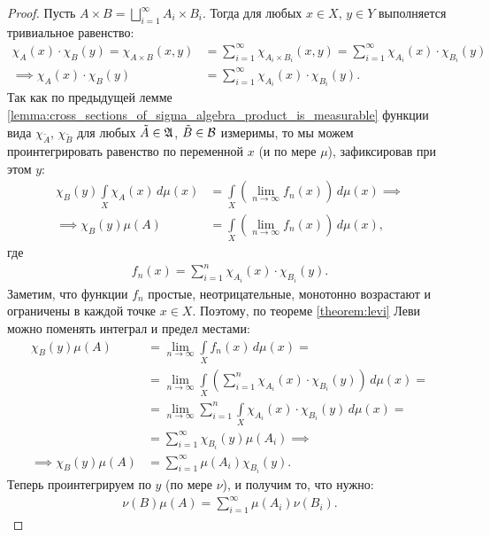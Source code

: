 \begin{proof}
 Пусть $A \times B = \bigsqcup_{i=1}^{\infty} A_i \times B_i$. Тогда для любых $x \in X$, $y \in Y$ выполняется тривиальное равенство: \begin{align*}
  \chi_A(x) \cdot \chi_B(y) = \chi_{A \times B}(x, y) &= \sum_{i=1}^{\infty} \chi_{A_i \times B_i}(x, y)  = \sum_{i=1}^{\infty} \chi_{A_i}(x) \cdot \chi_{B_i}(y) \\
  \implies \chi_A(x) \cdot \chi_B(y) &= \sum_{i=1}^{\infty} \chi_{A_i}(x) \cdot \chi_{B_i}(y)
  .\end{align*} Так как по предыдущей лемме \ref{lemma:cross_sections_of_sigma_algebra_product_is_measurable} функции вида $\chi_{\tilde A}$, $\chi_{\tilde B}$ для любых $\tilde A \in \mathfrak{A}$, $\tilde B \in \mathcal{B}$ измеримы, то мы можем проинтегрировать равенство по переменной $x$ (и по мере $\mu$), зафиксировав при этом $y$:  \begin{align*}
  \chi_B(y) \int\limits_{X} \chi_A(x) \, d\mu(x)   &= \int\limits_{X} \left( \lim_{n \to \infty} f_n(x)  \right) \, d\mu(x) \implies \\
 \implies \chi_B(y) \mu(A) &= \int\limits_{X} \left( \lim_{n \to \infty} f_n(x)  \right) \, d\mu(x)
,\end{align*} где \begin{align*}
f_n(x) = \sum_{i=1}^{n} \chi_{A_i}(x) \cdot \chi_{B_i}(y)
.\end{align*} Заметим, что функции $f_n$ простые, неотрицательные, монотонно возрастают и ограничены в каждой точке $x \in X$. Поэтому, по теореме \ref{theorem:levi} Леви можно поменять интеграл и предел местами:
 \begin{align*}
  \chi_B(y) \mu(A) &= \lim_{n \to \infty} \int\limits_{X} f_n(x) \, d\mu(x) = \\
  &= \lim_{n \to \infty} \int\limits_{X} \left( \sum_{i=1}^{n} \chi_{A_i}(x) \cdot \chi_{B_i}(y) \right) \, d\mu(x) =    \\
  &= \lim_{n \to \infty} \sum_{i=1}^{n} \int\limits_{X} \chi_{A_i}(x) \cdot \chi_{B_i}(y) \, d\mu(x) =    \\
  &= \sum_{i=1}^{\infty} \chi_{B_i}(y) \mu(A_i) \implies \\
  \implies \chi_B(y) \mu(A) &= \sum_{i=1}^{\infty} \mu(A_i) \chi_{B_i}(y)
 .\end{align*} Теперь проинтегрируем по $y$ (по мере $\nu$), и получим то, что нужно: \begin{align*}
 \nu(B) \mu(A) = \sum_{i=1}^{\infty} \mu(A_i) \nu(B_i)
.\end{align*} 
\end{proof}

